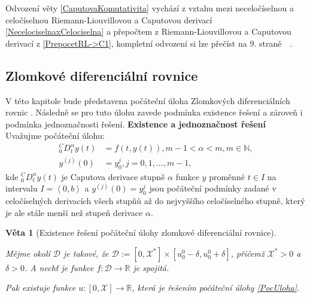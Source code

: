\documentclass[a4paper,12pt,twoside]{article}
\newtheorem{veta}{Věta}[section]
\theoremstyle{definition}
\theoremstyle{remark}
\numberwithin{equation}{section}
\numberwithin{table}{section}
\numberwithin{figure}{section}
\newcommand{\R}{\mathbb{R}}
\newcommand{\N}{\mathbb{N}}
\begin{document}
Odvození věty \ref{CaputovaKomutativita} vychází z vztahu mezi neceločíselnou a celočíselnou Riemann-Liouvillovou a Caputovou derivací \eqref{NecelociselnaxCelociselna} a přepočtem z Riemann-Liouvillovou a Caputovou derivací z \eqref{PrepocetRL->C1}, kompletní odvození si lze přečíst na 9. straně~\cite{Cangpin}~.


\subsection{Zlomkové diferenciální rovnice}
V této kapitole bude představena počáteční úloha Zlomkových diferenciálních rovnic \cite{Cangpin}. Následně se pro tuto úlohu zavede podmínka existence řešení a zároveň i podmínka jednoznačnosti řešení.
\textbf{Existence a jednoznačnost řešení} \\
Uvažujme počáteční úlohu:
\begin{equation} \label{PocUloha}
	\begin{aligned}
		^{C}_{0}D^{\alpha}_{t} y \left(t\right) &= f\left(t,y\left(t\right)\right), m-1 < \alpha < m, m \in \N, \\
		y^{\left(j\right)} \left(0\right) &= y_{0}^{j}, j=0,1,..., m-1,
	\end{aligned}	
\end{equation}
kde $^{C}_{0}D^{\alpha}_{t} y \left(t\right)$ je Caputova derivace stupně $\alpha$ funkce $y$ proměnné $t \in I$ na intervalu $I = \left\langle 0, b \right\rangle$ a $y^{\left(j\right)} \left(0\right) = y_{0}^{j}$ jsou počáteční podmínky zadané v celočíselných derivacích všech stupňů až do nejvyššího celočíselného stupně, který je ale stále menší než stupeň derivace $\alpha$.

\begin{veta}[Existence řešení počáteční úlohy zlomkové diferenciální rovnice]\label{ExistenceFDE}
	
	Mějme okolí $\mathcal{D}$ je takové, že $\mathcal{D} := \left[0,\mathcal{X} ^{*}\right] \times \left[u_{0}^{0} - \delta , u_{0}^{0} + \delta \right] $, přičemž $\mathcal{X}^{*}>0$ a $ \delta  > 0$. A nechť je funkce $f: \mathcal{D} \to \R$ je spojitá.
	
	Pak existuje funkce $u:\left[0, \mathcal{X}\right] \to \R$, která je řešením počáteční úlohy \eqref{PocUloha}.
\end{veta} 
\end{document}

